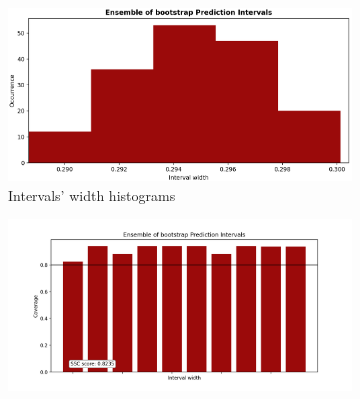 \begin{figure}[ht]
    \centering
    \begin{subfigure}[b]{0.32\textwidth}
        \centering
        \includegraphics[width=1.05\textwidth, height=0.85\textwidth]{Figures/timeseries/without-change-point/width-occurrence-timeseries-problem.png}
        \caption{Intervals' width histograms}
        \label{subfig:timeseries-width-histograms}
    \end{subfigure}
    \hfill
    \begin{subfigure}[b]{0.32\textwidth}
        \centering
        \includegraphics[width=1.15\textwidth, height=0.85\textwidth]{Figures/timeseries/without-change-point/coverage-vs-width-timeseries-problem.png}

\end{subfigure}
\end{figure}
